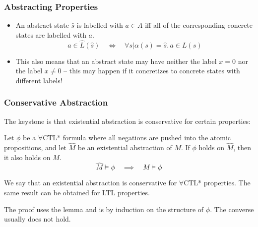 
\begin{frame}
\frametitle{Abstracting Properties}

\begin{itemize}

\item
An abstract state $\hat s$ is labelled with $a \in A$ iff
\alert{all} of the corresponding concrete states are labelled with $a$.
%
\[ a \in \hat L(\hat s) \quad\iff\quad \forall s | \alpha(s)=\hat s.\, a \in L(s) \]
\vfill

\item This also means that an abstract state may have neither the label
$x=0$ nor the label $x\not =0$ -- this may happen if it concretizes to
concrete states with different labels!

\end{itemize}

\end{frame}


\begin{frame}
\frametitle{Conservative Abstraction}

The keystone is that existential abstraction is \alert{conservative}
for certain properties:
%
\begin{theorem}
Let $\phi$ be a $\forall$CTL* formula where all negations
are pushed into the atomic propositions, and let $\hat M$
be an existential abstraction of $M$. If $\phi$ holds on
$\hat M$, then it also holds on $M$.
\[ \hat M \models \phi \quad\implies\quad M \models \phi \]
\end{theorem}
%
We say that an existential abstraction is conservative for $\forall$CTL*
properties. {\color{ta3skyblue}The same result can be obtained
for LTL properties}.
\vfill

The proof uses the lemma and is by induction on the structure of
$\phi$. The converse usually does not hold.
\end{frame}


